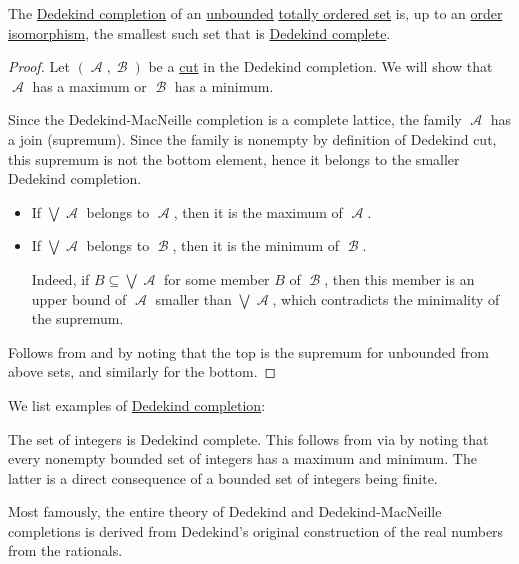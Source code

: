 \begin{theorem}\label{thm:def:dedekind_completion}
  The \hyperref[def:dedekind_completion]{Dedekind completion} of an \hyperref[def:extremal_points/upper_and_lower_bounds]{unbounded} \hyperref[def:totally_ordered_set]{totally ordered set} is, up to an \hyperref[def:order_homomorphism/isomorphism]{order isomorphism}, the smallest such set that is \hyperref[def:dedekind_completeness]{Dedekind complete}.
\end{theorem}
\begin{proof}
   Let \( (\mscrA, \mscrB) \) be a \hyperref[def:dedekind_cut]{cut} in the Dedekind completion. We will show that \( \mscrA \) has a maximum or \( \mscrB \) has a minimum.

  Since the Dedekind-MacNeille completion is a complete lattice, the family \( \mscrA \) has a join (supremum). Since the family is nonempty by definition of Dedekind cut, this supremum is not the bottom element, hence it belongs to the smaller Dedekind completion.
  \begin{itemize}
    \item If \( \bigvee \mscrA \) belongs to \( \mscrA \), then it is the maximum of \( \mscrA \).
    \item If \( \bigvee \mscrA \) belongs to \( \mscrB \), then it is the minimum of \( \mscrB \).

    Indeed, if \( B \subseteq \bigvee \mscrA \) for some member \( B \) of \( \mscrB \), then this member is an upper bound of \( \mscrA \) smaller than \( \bigvee \mscrA \), which contradicts the minimality of the supremum.
  \end{itemize}

   Follows from  and  by noting that the top is the supremum for unbounded from above sets, and similarly for the bottom.
\end{proof}

\begin{example}\label{ex:thm:def:dedekind_completion}
  We list examples of \hyperref[def:dedekind_completion]{Dedekind completion}:
  \begin{thmenum}
     The set of integers is Dedekind complete. This follows from  via  by noting that every nonempty bounded set of integers has a maximum and minimum. The latter is a direct consequence of a bounded set of integers being finite.

     Most famously, the entire theory of Dedekind and Dedekind-MacNeille completions is derived from Dedekind's original construction of the real numbers from the rationals.
  \end{thmenum}
\end{example}

